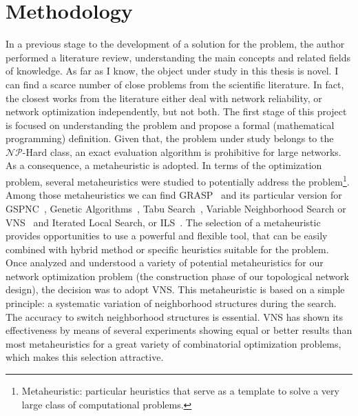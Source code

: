 \section{Methodology}
In a previous stage to the development of a solution for the problem, the author performed a literature review, understanding the main concepts and related fields of knowledge. 
As far as I know, the object under study in this thesis is novel. I can find a scarce number of close  problems from the scientific literature. In fact, the closest works from the literature either deal with 
network reliability, or network optimization independently, but not both. The first stage of this project is focused on understanding the problem and propose a formal (mathematical programming) definition. Given that, the problem under study belongs to the $\mathcal{NP}$-Hard class, an exact evaluation algorithm is prohibitive for large networks. As a consequence, a metaheuristic is adopted. In terms of the optimization problem, several metaheuristics were studied to potentially address the problem\footnote{Metaheuristic: particular heuristics that serve as a template to solve a very large class of computational problems.}. Among those metaheuristics we can find GRASP~\cite{5,6,51} and its particular version for 
GSPNC~\cite{2,11}, Genetic Algorithms~\cite{1,5},  Tabu Search~\cite{5,15}, Variable Neighborhood Search or VNS~\cite{16,17,18} and Iterated Local Search, or ILS~\cite{5,19,60}. The selection of a metaheuristic provides opportunities to use a powerful and flexible tool, that can be easily combined with 
hybrid method or specific heuristics suitable for the problem. Once analyzed and understood a variety of potential metaheuristics for our network optimization problem (the construction phase of our topological network design), 
the decision was to adopt VNS. This metaheuristic is 
based on a simple principle: a systematic variation of neighborhood structures during the search. 
The accuracy to switch neighborhood structures is essential. VNS has shown its effectiveness by means of several experiments showing equal or better results than most metaheuristics for a great variety of combinatorial optimization problems, which makes this selection attractive.

